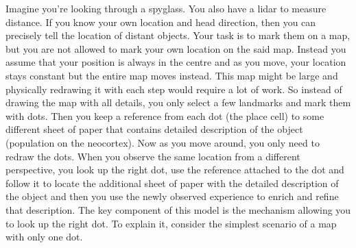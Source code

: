 \documentclass[12pt]{article}
\begin{document}
Imagine you're looking through a spyglass. You also have a lidar to measure distance. If you know your own location and head direction, then you can precisely tell the location of distant objects. Your task is to mark them on a map, but you are not allowed to mark your own location on the said map. Instead you assume that your position is always in the centre and as you move, your location stays constant but the entire map moves instead. This map might be large and physically redrawing it with each step would require a lot of work. So instead of drawing the map with all details, you only select a few landmarks and mark them with dots. Then you keep a reference from each dot (the place cell) to some different sheet of paper  that contains detailed description of the object (population on the neocortex).
Now as you move around, you only need to redraw the dots. When you observe the same location from a different perspective, you look up the right dot, use the reference attached to the dot and follow it to locate the additional sheet of paper with the detailed description of the object and then you use the newly observed experience to enrich and refine that description. The key component of this model is the mechanism allowing you to look up the right dot. To explain it, consider the simplest scenario of a map with only one dot.
\end{document}
